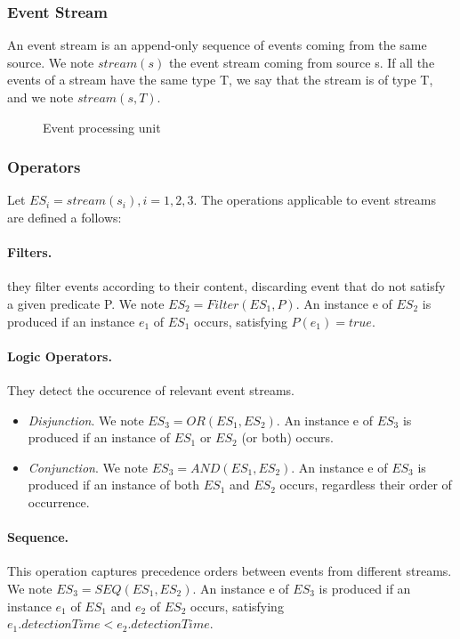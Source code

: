 \documentclass[a4paper,twoside]{article}
\begin{document}
\subsubsection{Event Stream}
An event stream is an append-only sequence of events coming from the same source. We note $stream(s)$ the event stream coming from source s. If all the events of a stream have the same type T, we say that the stream is of type T, and we note $stream(s,T)$. 

\begin{figure*}
  \centering
   {}
  \caption{Event processing unit}
  \label{fig:event processing unit}
 \end{figure*}

\subsubsection{Operators}
Let $ES_i = stream(s_i), i=1,2,3 $. 
The operations applicable to event streams are defined a follows:
\paragraph{Filters.} they filter events according to their content, discarding event that do not satisfy a given predicate P. 
We note $ES_2 = Filter(ES_1, P)$. An instance e of $ES_2$ is produced if an instance $e_1$ of $ES_1$ occurs, satisfying $P(e_1) = true$.
\paragraph{Logic Operators.} They detect the occurence of relevant event streams.
\begin{itemize}
\item \textit{Disjunction}. We note $ES_3 = OR(ES_1, ES_2)$. An instance e of $ES_3$ is produced if an instance of $ES_1$ or $ES_2$ (or both) occurs.
\item \textit{Conjunction}. We note $ES_3 = AND(ES_1, ES_2)$. An instance e of $ES_3$ is produced if an instance of both $ES_1$ and $ES_2$ occurs, regardless their order of occurrence.
\end{itemize}
\paragraph{Sequence.} This operation captures precedence orders between events from different streams. We note $ES_3= SEQ(ES_1, ES_2)$. An instance e of $ES_3$ is produced if an instance $e_1$ of $ES_1$ and $e_2$ of $ES_2$ occurs, satisfying $e_{1}.detectionTime < e_{2}.detectionTime$. 
\end{document}
